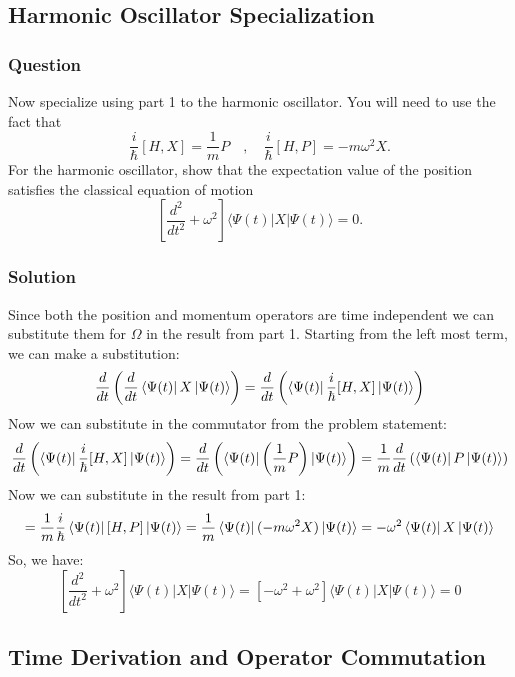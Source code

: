 \documentclass[12pt]{article}
\begin{document}
\subsection{Harmonic Oscillator Specialization}
\subsubsection{Question}
Now specialize using part 1 to the harmonic oscillator. You will need to use the fact that
\[
\frac{i}{\hbar} [H, X] = \frac{1}{m} P \quad , \quad \frac{i}{\hbar} [H, P] = -m\omega^2X.
\]
For the harmonic oscillator, show that the expectation value of the position satisfies the classical equation of motion
\[
\left[ \frac{d^2}{dt^2} + \omega^2 \right] \langle \Psi(t)|X|\Psi(t)\rangle = 0.
\]
\subsubsection{Solution}
Since both the position and momentum operators are time independent we can substitute them for \(\Omega\) in the result from part 1. Starting from the left most term, we can make a substitution:
\begin{equation}
    \frac{d}{dt}\left(\frac{d}{dt}\bra{\Psi (t)}X\ket{\Psi (t)}\right) = \frac{d}{dt}\left(\bra{\Psi(t)}\frac{i}{\hbar}[H, X]\ket{\Psi(t)}\right)
\end{equation}
Now we can substitute in the commutator from the problem statement:
\begin{equation}
    \frac{d}{dt}\left(\bra{\Psi(t)}\frac{i}{\hbar}[H, X]\ket{\Psi(t)}\right) = \frac{d}{dt}\left(\bra{\Psi(t)}\left(\frac{1}{m}P\right)\ket{\Psi(t)}\right) = \frac{1}{m} \frac{d}{dt}\left(\bra{\Psi(t)}P\ket{\Psi(t)}\right)
\end{equation}
Now we can substitute in the result from part 1:
\begin{equation}
    = \frac{1}{m} \frac{i}{\hbar}\bra{\Psi(t)}[H, P]\ket{\Psi(t)} = \frac{1}{m} \bra{\Psi(t)}(-m\omega^{2}X)\ket{\Psi(t)} = -\omega^{2}\bra{\Psi(t)}X\ket{\Psi(t)}
\end{equation}
So, we have:
\begin{equation}
    \boxed{[  \frac{d^{2}}{dt^2} + \omega^2 ] \langle \Psi(t)|X|\Psi(t)\rangle = [ -\omega ^{2}+\omega ^{2} ] \langle \Psi(t)|X|\Psi(t)\rangle = 0}
\end{equation}
\subsection{Time Derivation and Operator Commutation}
\end{document}

